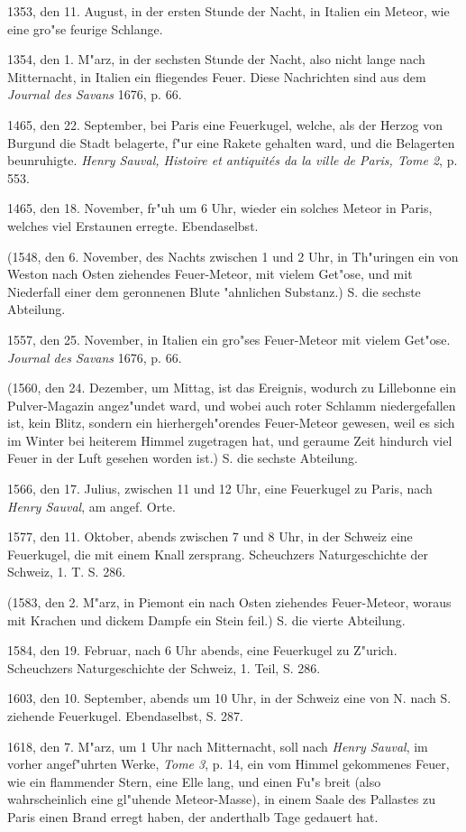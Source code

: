 \documentclass[a4paper, 11pt, oneside, polutonikogreek, german]{article}
\begin{document}
1353, den 11. August, in der ersten Stunde der Nacht, in Italien ein Meteor, wie eine gro"se feurige Schlange.

1354, den 1. M"arz, in der sechsten Stunde der Nacht, also nicht lange nach Mitternacht, in Italien ein fliegendes Feuer. Diese Nachrichten sind aus dem \emph{Journal des Savans} 1676, p. 66.

1465, den 22. September, bei Paris eine Feuerkugel, welche, als der Herzog von Burgund die Stadt belagerte, f"ur eine Rakete gehalten ward, und die Belagerten beunruhigte. \emph{Henry Sauval, Histoire et antiquités da la ville de Paris, Tome 2}, p. 553.

1465, den 18. November, fr"uh um 6 Uhr, wieder ein solches Meteor in Paris, welches viel Erstaunen erregte. Ebendaselbst.

(1548, den 6. November, des Nachts zwischen 1 und 2 Uhr, in Th"uringen ein von Weston nach Osten ziehendes Feuer-Meteor, mit vielem Get"ose, und mit Niederfall einer dem geronnenen Blute "ahnlichen Substanz.) S. die sechste Abteilung.

1557, den 25. November, in Italien ein gro"ses Feuer-Meteor mit vielem Get"ose. \emph{Journal des Savans} 1676, p. 66.

(1560, den 24. Dezember, um Mittag, ist das Ereignis, wodurch zu Lillebonne ein Pulver-Magazin angez"undet ward, und wobei auch roter Schlamm niedergefallen ist, kein Blitz, sondern ein hierhergeh"orendes Feuer-Meteor gewesen, weil es sich im Winter bei heiterem Himmel zugetragen hat, und geraume Zeit hindurch viel Feuer in der Luft gesehen worden ist.) S. die sechste Abteilung.

1566, den 17. Julius, zwischen 11 und 12 Uhr, eine Feuerkugel zu Paris, nach \emph{Henry Sauval}, am angef. Orte.

1577, den 11. Oktober, abends zwischen 7 und 8 Uhr, in der Schweiz eine Feuerkugel, die mit einem Knall zersprang. Scheuchzers Naturgeschichte der Schweiz, 1. T. S. 286.

(1583, den 2. M"arz, in Piemont ein nach Osten ziehendes Feuer-Meteor, woraus mit Krachen und dickem Dampfe ein Stein feil.) S. die vierte Abteilung.

1584, den 19. Februar, nach 6 Uhr abends, eine Feuerkugel zu Z"urich. Scheuchzers Naturgeschichte der Schweiz, 1. Teil, S. 286.

1603, den 10. September, abends um 10 Uhr, in der Schweiz eine von N. nach S. ziehende Feuerkugel. Ebendaselbst, S. 287.

1618, den 7. M"arz, um 1 Uhr nach Mitternacht, soll nach \emph{Henry Sauval}, im vorher angef"uhrten Werke, \emph{Tome 3}, p. 14, ein vom Himmel gekommenes Feuer, wie ein flammender Stern, eine Elle lang, und einen Fu"s breit (also wahrscheinlich eine gl"uhende Meteor-Masse), in einem Saale des Pallastes zu Paris einen Brand erregt haben, der anderthalb Tage gedauert hat.
\end{document}
